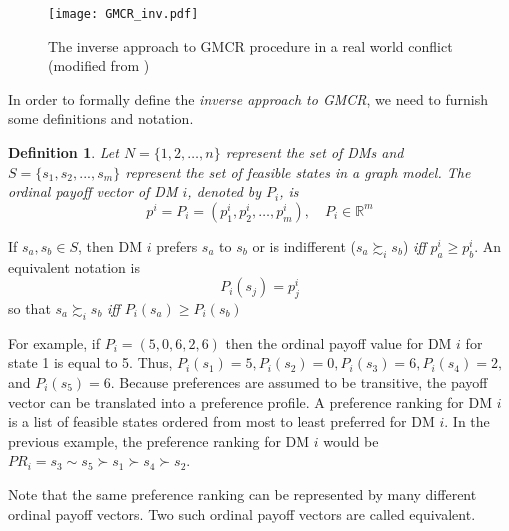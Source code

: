 \documentclass[letterpaper,12pt,titlepage,oneside,final]{book}
\newtheorem{definition}[lemma]{Definition}
\begin{document}
\begin{center}
\begin{figure}[H]
\centering
\texttt{[image: GMCR\_inv.pdf]}

\caption{The inverse approach to GMCR procedure in a real world conflict (modified from \citet{fang1993})}

\label{fig:procedure_inv}
\end{figure}
\end{center}

In order to formally define the \textit{inverse approach to GMCR}, we need to furnish some definitions and notation. 

\begin{definition}
\rm

Let $N=\{1,2,\dots,n\}$ represent the set of DMs and $S=\{s_1, s_2, ..., s_m\}$ represent the set of feasible states in a graph model. The ordinal payoff vector of DM $i$, denoted by $P_i$, is
$$p^i=P_i=(p_1^i,p_2^i, \dots ,p_m^i ) , \quad P_i \in \mathbb{R}^m  $$

\end{definition}

\noindent If $s_a,s_b \in S$, then DM $i$ prefers $s_a$ to $s_b$ or is indifferent ($s_a \succsim_i s_b$) \emph{iff} $p_a^i \geq p_b^i$. An equivalent notation is $$P_i(s_j)=p_j^i$$ so that $s_a\succsim_i s_b$ \emph{iff} $P_i(s_a)\geq P_i(s_b)$

For example, if $P_i=(5,0,6,2,6)$ then the ordinal payoff value for DM $i$ for state 1 is equal to 5. Thus, $P_i(s_1)=5,P_i(s_2)=0,P_i(s_3)=6,P_i(s_4)=2,$ and $P_i(s_5)=6$. Because preferences are assumed to be transitive, the payoff vector can be translated into a preference profile. A preference ranking for DM $i$ is a list of feasible states ordered from most to least preferred for DM $i$. %
In the previous example, the preference ranking for DM $i$ would be $PR_i=s_3 \sim s_5 \succ s_1 \succ s_4 \succ s_2$.

Note that the same preference ranking can be represented by many different ordinal payoff vectors. Two such ordinal payoff vectors are called equivalent.

\end{document}
